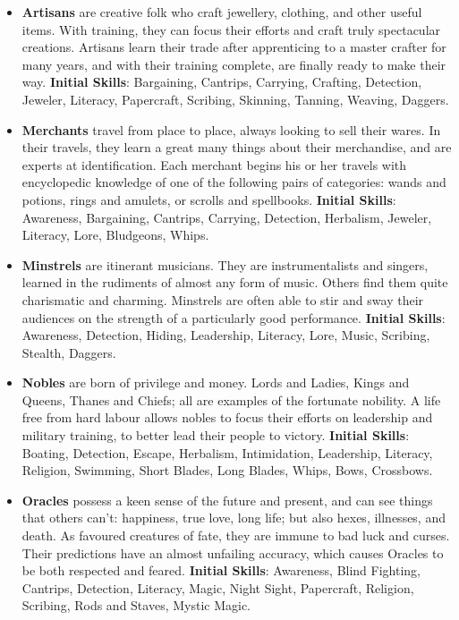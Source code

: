 \begin{itemize}
\item {\bf Artisans} are creative folk who craft jewellery, clothing, and 
other useful items.  With training, they can focus their efforts and craft 
truly spectacular creations.  Artisans learn their trade after apprenticing
to a master crafter for many years, and with their training complete, are
finally ready to make their way.  \textbf{Initial Skills}: Bargaining,
Cantrips, Carrying, Crafting, Detection, Jeweler, Literacy, Papercraft, 
Scribing, Skinning, Tanning, Weaving, Daggers.

\item {\bf Merchants} travel from place to place, always looking to sell 
their wares.  In their travels, they learn a great many things about their 
merchandise, and are experts at identification.  Each merchant begins his 
or her travels with encyclopedic knowledge of one of the following pairs
of categories: wands and potions, rings and amulets, or scrolls and 
spellbooks.
\textbf{Initial Skills}: Awareness, Bargaining, Cantrips, Carrying,
Detection, Herbalism, Jeweler, Literacy, Lore, Bludgeons, Whips.

\item {\bf Minstrels} are itinerant musicians.  They are instrumentalists 
and singers, learned in the rudiments of almost any form of music.  Others 
find them quite charismatic and charming.  Minstrels are often able to stir
and sway their audiences on the strength of a particularly good performance.
\textbf{Initial Skills}: Awareness, Detection, Hiding, Leadership, 
Literacy, Lore, Music, Scribing, Stealth, Daggers.

\item {\bf Nobles} are born of privilege and money.  Lords and Ladies, 
Kings and Queens, Thanes and Chiefs; all are examples of the fortunate 
nobility.  A life free from hard labour allows nobles to focus their 
efforts on leadership and military training, to better lead their people 
to victory.  \textbf{Initial Skills}: Boating, Detection, Escape, 
Herbalism, Intimidation, Leadership, Literacy, Religion, Swimming, 
Short Blades, Long Blades, Whips, Bows, Crossbows.

\item {\bf Oracles} possess a keen sense of the future and present, and can
see things that others can't: happiness, true love, long life; but also 
hexes, illnesses, and death.  As favoured creatures of fate, they are 
immune to bad luck and curses.  Their predictions have an almost unfailing 
accuracy, which causes Oracles to be both respected and feared.
\textbf{Initial Skills}: Awareness, Blind Fighting, Cantrips, Detection,
Literacy, Magic, Night Sight, Papercraft, Religion, Scribing, Rods and
Staves, Mystic Magic.


\end{itemize}
